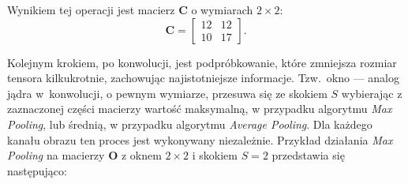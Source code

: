 \documentclass[pl,12pt]{aghdpl}
\begin{document}
\tikzset{external/export=true}
Wynikiem tej operacji jest macierz $\bm C$ o wymiarach $2\times 2$:
\begin{equation}
  \bm C = \begin{bmatrix}
    12 & 12\\
    10 & 17
  \end{bmatrix}.
\end{equation}

Kolejnym krokiem, po konwolucji, jest podpróbkowanie, które zmniejsza rozmiar
tensora kilkukrotnie, zachowując najistotniejsze informacje. Tzw.\  okno --- analog
jądra w~konwolucji, o pewnym wymiarze, przesuwa się ze skokiem $S$ wybierając z
zaznaczonej części macierzy wartość maksymalną, w przypadku algorytmu
\textit{Max Pooling}, lub średnią, w przypadku algorytmu \textit{Average
Pooling}. Dla każdego kanału obrazu ten proces jest wykonywany niezależnie.
Przykład działania \textit{Max Pooling} na macierzy $\bm O$ z oknem $2 \times
2$ i skokiem $S = 2$ przedstawia się następująco:
\tikzset{external/export=false}
\end{document}
